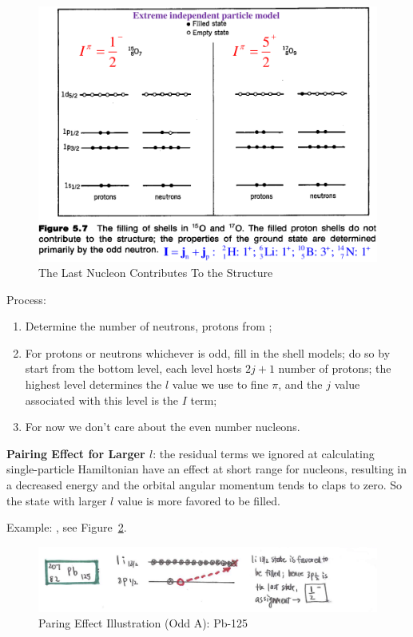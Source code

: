 \documentclass{school-22.101-notes}
\begin{document}
\begin{figure}[ht]
  \centering
  \includegraphics[width=4.5in]{images/ns/odd-A-nuclide.png}
  \caption{The Last Nucleon Contributes To the Structure} \label{odd-A-nuclide}
\end{figure}

Process: 
\begin{enumerate}
\item Determine the number of neutrons, protons from ;
\item For protons or neutrons whichever is odd, fill in the shell models; do so by start from the bottom level, each level hosts $2j+1$ number of protons; the highest level determines the $l$ value we use to fine $\pi$, and the $j$ value associated with this level is the $I$ term;
\item For now we don't care about the even number nucleons. 
\end{enumerate}

\textbf{Pairing Effect for Larger $l$}: the residual terms we ignored at calculating single-particle Hamiltonian have an effect at short range for nucleons, resulting in a decreased energy and the orbital angular momentum tends to claps to zero. So the state with larger $l$ value is more favored to be filled. 

Example: , see Figure~\ref{ns-Pb-125}.
\begin{figure}[ht]
    \centering
    \includegraphics[width=5in]{images/ns/Pb-125.png}
    \caption{Paring Effect Illustration (Odd A): Pb-125}
    \label{ns-Pb-125}
\end{figure}
\end{document}
